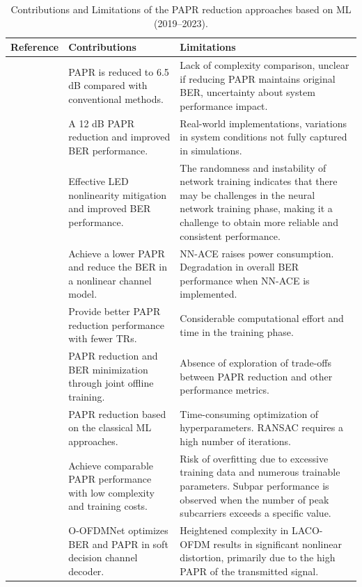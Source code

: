 \documentclass[conference]{IEEEtran}
\begin{document}
\begin{table}[t]
\caption{Contributions and Limitations of the PAPR reduction approaches based on ML (2019--2023).}
\begin{center}
\begin{tabular}{|c|p{6cm}|p{8cm}|}
\hline
\textbf{Reference} & \textbf{Contributions} & \textbf{Limitations} \\
\hline
\cite{b141} & PAPR is reduced to 6.5 dB compared with conventional methods. & Lack of complexity comparison, unclear if reducing PAPR maintains original BER, uncertainty about system performance impact. \\
\hline
\cite{b143} & A 12 dB PAPR reduction and improved BER performance. & Real-world implementations, variations in system conditions not fully captured in simulations. \\
\hline
\cite{b147} & Effective LED nonlinearity mitigation and improved BER performance. & The randomness and instability of network training indicates that there may be challenges in the neural network training phase, making it a challenge to obtain more reliable and consistent performance. \\
\hline
\cite{b142} & Achieve a lower PAPR and reduce the BER in a nonlinear channel model. & NN-ACE raises power consumption. Degradation in overall BER performance when NN-ACE is implemented. \\
\hline
\cite{b148} & Provide better PAPR reduction performance with fewer TRs. & Considerable computational effort and time in the training phase. \\
\hline
\cite{b145} & PAPR reduction and BER minimization through joint offline training. & Absence of exploration of trade-offs between PAPR reduction and other performance metrics. \\
\hline
\cite{b134} & PAPR reduction based on the classical ML approaches. & Time-consuming optimization of hyperparameters. RANSAC requires a high number of iterations. \\
\hline
\cite{b149} & Achieve comparable PAPR performance with low complexity and training costs. & Risk of overfitting due to excessive training data and numerous trainable parameters. Subpar performance is observed when the number of peak subcarriers exceeds a specific value. \\
\hline
\cite{b151} & O-OFDMNet optimizes BER and PAPR in soft decision channel decoder. & Heightened complexity in LACO-OFDM results in significant nonlinear distortion, primarily due to the high PAPR of the transmitted signal. \\

\end{tabular}
\end{center}
\end{table}
\end{document}

